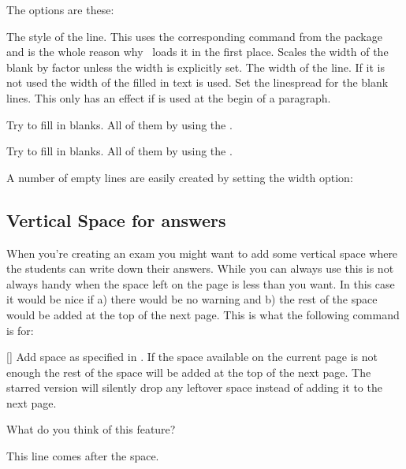 \documentclass[load-preamble+,scrartcl={DIV10}]{cnltx-doc}
\begin{document}
The options are these:
\begin{options}
    The style of the line.  This uses the corresponding command from the
     package and is the whole reason why \ExSheets\ loads it in the
    first place.
    Scales the width of the blank by factor  unless the width is
    explicitly set.
  \Default
    The width of the line.  If it is not used the width of the filled in text
    is used.
    Set the linespread for the blank lines.  This only has an effect if
     is used at the begin of a paragraph.
\end{options}
\begin{example}
  \begin{question}
    Try to fill in  blanks. All of them
     by using the 
    .
  \end{question}
  \begin{solution}[print]
    Try to fill in  blanks. All of them
     by using the 
    .
  \end{solution}
\end{example}
A number of empty lines are easily created by setting the width option:
\begin{example}
  \blank[width=4.8\linewidth,linespread=1.5]{}
\end{example}

\subsection{Vertical Space for answers}
\noindent{}When you're creating an exam you might want to add
some vertical space where the students can write down their answers.  While
you can always use  this is not always handy when the space left
on the page is less than you want.  In this case it would be nice if a) there
would be no warning and b) the rest of the space would be added at the top of
the next page.  This is what the following command is for:
\begin{commands}
  [\sarg{}]
    Add space as specified in . If the space available on the
    current page is not enough the rest of the space will be added at the top
    of the next page.  The starred version will silently drop any leftover
    space instead of adding it to the next page.
\end{commands}
\begin{example}
  \begin{question}
   What do you think of this feature?
   \examspace{3cm}
  \end{question}
  This line comes after the space.
\end{example}
\end{document}
